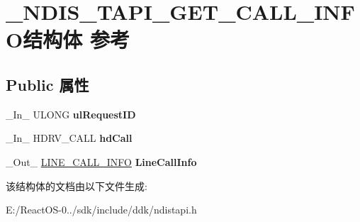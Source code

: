 \hypertarget{struct___n_d_i_s___t_a_p_i___g_e_t___c_a_l_l___i_n_f_o}{}\section{\+\_\+\+N\+D\+I\+S\+\_\+\+T\+A\+P\+I\+\_\+\+G\+E\+T\+\_\+\+C\+A\+L\+L\+\_\+\+I\+N\+F\+O结构体 参考}
\label{struct___n_d_i_s___t_a_p_i___g_e_t___c_a_l_l___i_n_f_o}
\subsection*{Public 属性}
\begin{DoxyCompactItemize}
\item 
\mbox{\label{struct___n_d_i_s___t_a_p_i___g_e_t___c_a_l_l___i_n_f_o_ad0c532a8111822db7db8e8d5be30be3d}} 
\+\_\+\+In\+\_\+ U\+L\+O\+NG {\bfseries ul\+Request\+ID}
\item 
\mbox{\label{struct___n_d_i_s___t_a_p_i___g_e_t___c_a_l_l___i_n_f_o_a5bb68cab6a22596d403d2c6aab808103}} 
\+\_\+\+In\+\_\+ H\+D\+R\+V\+\_\+\+C\+A\+LL {\bfseries hd\+Call}
\item 
\mbox{\label{struct___n_d_i_s___t_a_p_i___g_e_t___c_a_l_l___i_n_f_o_ac46a10fd8e1222117ddd621f5220dea6}} 
\+\_\+\+Out\+\_\+ \hyperlink{struct___l_i_n_e___c_a_l_l___i_n_f_o}{L\+I\+N\+E\+\_\+\+C\+A\+L\+L\+\_\+\+I\+N\+FO} {\bfseries Line\+Call\+Info}
\end{DoxyCompactItemize}


该结构体的文档由以下文件生成\+:\begin{DoxyCompactItemize}
\item 
E\+:/\+React\+O\+S-\/0../sdk/include/ddk/ndistapi.\+h\end{DoxyCompactItemize}
